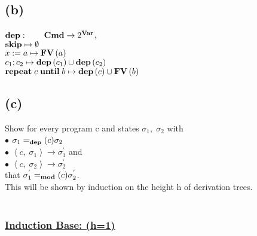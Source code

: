 \documentclass[12pt,a4paper]{article}
\newcommand{\Mod}[0]{\text{\textbf{mod}}}
\newcommand{\dep}[0]{\text{\textbf{dep}}}
\begin{document}
	\subsection*{(b)}
	
	\indent\indent $\text{\textbf{dep}}: \qquad \text{\textbf{Cmd}}\rightarrow 2^{\text{\textbf{Var}}}$,\\
	\indent $\text{\textbf{skip}}\mapsto\emptyset$\\
	\indent $x:=a\mapsto \text{\textbf{FV}}\left( a\right)$\\
	\indent $c_1;c_2\mapsto \text{\textbf{dep}}\left( c_1\right) \cup\text{\textbf{dep}}\left( c_2\right)$\\
	\indent $\text{\textbf{repeat}}\; c\; \text{\textbf{until}}\; b \mapsto \text{\textbf{dep}}\left( c\right) \cup \text{\textbf{FV}}\left( b\right)$

	\subsection*{(c)}
	
	\indent\indent Show for every program c and states $\sigma_{1} ,\; \sigma_{2}$ with\\
	\indent\indent $\bullet$ \quad $\sigma_{1} =_\dep(c) \sigma_{2}$\\
	\indent\indent $\bullet$ \quad $\left\langle c,\; \sigma_{1} \right\rangle \rightarrow \sigma^{'}_{1}$ and\\
	\indent\indent $\bullet$ \quad $\left\langle c, \; \sigma_{2}\right\rangle \rightarrow \sigma^{'}_{2}$\\
	\indent that $\sigma^{'}_{1} =_\Mod(c)\sigma^{'}_{2}$.\\
	\indent This will be shown by induction on the height h of derivation trees.\\\\
	\subsubsection*{\underline{Induction Base: (h=1)}}
	
\end{document}
